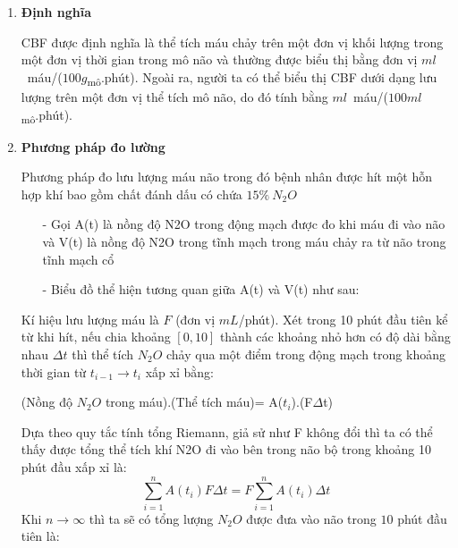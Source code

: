 \documentclass[12pt,a4paper]{article}
\begin{document}
\begin{enumerate}[a/]
	\item \textbf{Định nghĩa}

	      \begin{flushleft}
		      CBF được định nghĩa là thể tích máu chảy trên một đơn vị khối lượng trong
		      một đơn vị thời gian trong mô não và thường được biểu thị bằng đơn vị $ml$\ máu/($100g$\textsubscript{mô}.phút).
		      Ngoài ra, người ta có thể biểu thị CBF dưới dạng lưu lượng trên một đơn vị thể tích mô não,
		      do đó tính bằng $ml$\ máu/($100ml$\textsubscript{mô}.phút).
	      \end{flushleft}
	\item \textbf{Phương pháp đo lường}
	      \begin{flushleft}

		      Phương pháp đo lưu lượng máu não trong đó bệnh nhân được
		      hít một hỗn hợp khí bao gồm chất đánh dấu có chứa $15\%\ N_2O$ \\
		      \begin{itemize}
			      \item[-] 	Gọi A(t) là nồng độ N2O trong động mạch được đo khi máu đi vào não và V(t) là nồng độ N2O trong tĩnh mạch trong máu chảy ra từ não trong tĩnh mạch cổ\\
			      \item[-] 	Biểu đồ thể hiện tương quan giữa A(t) và V(t) như sau: \\
		      \end{itemize}
		      Kí hiệu lưu lượng máu là $F$ (đơn vị $mL$/phút). Xét trong 10 phút đầu tiên
		      kể từ khi hít, nếu chia khoảng $\left[0,10\right]$ thành các khoảng nhỏ hơn có độ dài bằng nhau $\Delta t$ thì
		      thể tích $N_2O$ chảy qua một điểm trong động mạch trong khoảng thời gian từ $t_{i-1} \to t_i$ xấp xỉ bằng: \\
	      \end{flushleft}
	      \begin{center}
		      (Nồng độ $N_2O$ trong máu).(Thể tích máu)= A($t_i$).(F$\Delta$t)
	      \end{center}
	      \begin{flushleft}
		      Dựa theo quy tắc tính tổng Riemann, giả sử như F không đổi thì ta có thể thấy được tổng thể tích khí N2O đi vào bên trong não bộ trong khoảng 10 phút đầu xấp xỉ là: $$\sum_{i = 1}^{n} A(t_i)F\Delta t = F \sum_{i = 1}^{n} A(t_i) \Delta t$$
		      Khi $n \to \infty$ thì ta sẽ có tổng lượng $N_2O$ được đưa vào não trong $10$ phút đầu tiên là:

\end{flushleft}
\end{enumerate}
\end{document}
